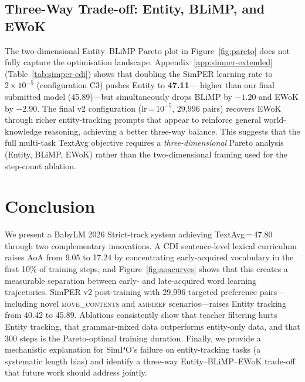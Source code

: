 \documentclass[11pt]{article}
\begin{document}
\subsection{Three-Way Trade-off: Entity, BLiMP, and EWoK}
\label{sec:tradeoff}

The two-dimensional Entity--BLiMP Pareto plot in
Figure~\ref{fig:pareto} does not fully capture
the optimisation landscape.
Appendix~\ref{app:simper-extended} (Table~\ref{tab:simper-cdi})
shows that doubling the SimPER learning rate to $2{\times}10^{-5}$
(configuration C3) pushes Entity to \textbf{47.11}---
higher than our final submitted model (45.89)---but
simultaneously drops BLiMP by $-1.20$ and EWoK by $-2.90$.
The final v2 configuration (lr\,=\,$10^{-5}$, 29{,}996 pairs)
recovers EWoK through richer entity-tracking prompts that
appear to reinforce general world-knowledge reasoning,
achieving a better three-way balance.
This suggests that the full multi-task TextAvg objective
requires a \emph{three-dimensional} Pareto analysis
(Entity, BLiMP, EWoK) rather than the two-dimensional
framing used for the step-count ablation.

\section{Conclusion}

We present a BabyLM 2026 Strict-track system achieving
TextAvg\,=\,47.80 through two complementary innovations.
A CDI sentence-level lexical curriculum raises AoA from
9.05 to 17.24 by concentrating early-acquired vocabulary
in the first 10\% of training steps, and Figure~\ref{fig:aoacurves}
shows that this creates a measurable separation between
early- and late-acquired word learning trajectories.
SimPER v2 post-training with 29{,}996 targeted preference pairs---
including novel \textsc{move\_contents} and \textsc{ambiref}
scenarios---raises Entity tracking from 40.42 to 45.89.
Ablations consistently show that teacher filtering hurts
Entity tracking, that grammar-mixed data outperforms entity-only data,
and that 300 steps is the Pareto-optimal training duration.
Finally, we provide a mechanistic explanation for SimPO's failure
on entity-tracking tasks (a systematic length bias) and identify
a three-way Entity--BLiMP--EWoK trade-off that future work
should address jointly.

\end{document}
